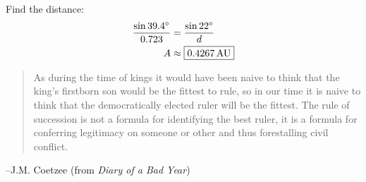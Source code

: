 \documentclass{exam}
\newcommand{\dg}{\ensuremath{^\circ}}
\begin{document}
\begin{description}
        Find the distance:
        \begin{align*}
          \frac{\sin 39.4 \dg}{0.723} & = \frac{\sin 22 \dg}{d} \\
          A                     & \approx \boxed{ \unit[0.4267]{AU} } \\
        \end{align*}

    \end{description}

  \else
    \vspace{1 cm}
    \begin{quote}
      \begin{em}
        As during the time of kings it would have been naive to think that the king's firstborn son would be the fittest to
        rule, so in our time it is naive to think that the democratically elected ruler will be the fittest. The rule of
        succession is not a formula for identifying the best ruler, it is a formula for conferring legitimacy on someone or
        other and thus forestalling civil conflict.
      \end{em}
    \end{quote}
    \hspace{1.5 cm} --J.M. Coetzee (from {\em Diary of a Bad Year})
  \fi
\end{document}
